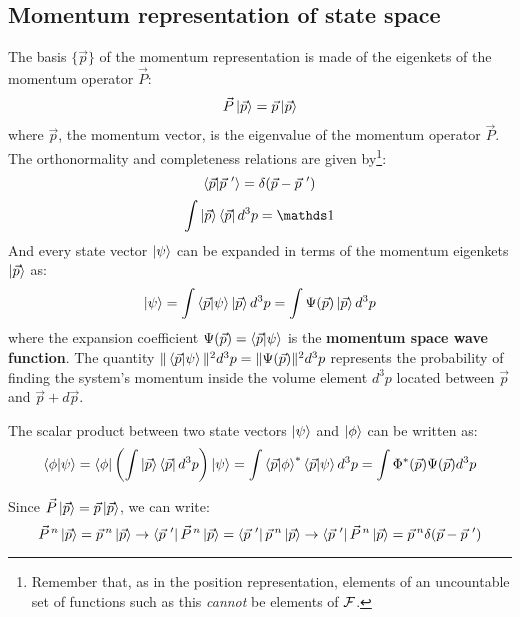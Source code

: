 \subsection{Momentum representation of state space}

The basis $\{\vec{p}\}$ of the momentum representation is made of the eigenkets of the momentum operator $\vec{P}$:
\begin{equation}
    \vec{P}\ket{\vec{p}} = \vec{p}\ket{\vec{p}}
\end{equation}
where $\vec{p}$, the momentum vector, is the eigenvalue of the momentum operator $\vec{P}$. The orthonormality and completeness relations are given by\footnote{Remember that, as in the position representation, elements of an uncountable set of functions such as this \textit{cannot} be elements of $\mathcal{F}$.}:
\begin{equation}
    \braket{\vec{p}|\vec{p}\ '} = \delta(\vec{p} - \vec{p}\ ')
\end{equation}
\begin{equation}
    \int \ket{\vec{p}}\bra{\vec{p}} d^3p = \Imat
\end{equation}
And every state vector $\ket{\psi}$ can be expanded in terms of the momentum eigenkets $\ket{\vec{p}}$ as:
\begin{equation}
    \ket{\psi} = \int \braket{\vec{p}|\psi} \ket{\vec{p}} d^3 p = \int \Psi(\vec{p}) \ket{\vec{p}} d^3 p
\end{equation}
where the expansion coefficient $\Psi(\vec{p}) = \braket{\vec{p}|\psi}$ is the \textbf{momentum space wave function}. The quantity $\|\braket{\vec{p}|\psi}\|^2d^3 p = \|\Psi(\vec{p})\|^2d^3p$ represents the probability of finding the system's momentum inside the volume element $d^3p$ located between $\vec{p}$ and $\vec{p} + d\vec{p}$.

The scalar product between two state vectors $\ket{\psi}$ and $\ket{\phi}$ can be written as:
\begin{equation}
    \braket{\phi|\psi} = \bra{\phi}\left(\int \ket{\vec{p}}\bra{\vec{p}}d^3p\right)\ket{\psi} = \int \braket{\vec{p}|\phi}^*\braket{\vec{p}|\psi} d^3p = \int \Phi^*(\vec{p})\Psi(\vec{p}) d^3p
\end{equation}

Since $\vec{P}\ket{\vec{p}} = \vec{p}\ket{\vec{p}}$, we can write:
\begin{equation}
    \vec{P}^{\, n}\ket{\vec{p}} = \vec{p}\, ^n\ket{\vec{p}} \to \bra{\vec{p}\ '}\vec{P}^{\, n}\ket{\vec{p}} = \bra{\vec{p}\ '}\vec{p}\, ^n\ket{\vec{p}} \to \bra{\vec{p}\ '}\vec{P}^{\, n}\ket{\vec{p}} = \vec{p}\, ^n\delta(\vec{p} - \vec{p}\ ')
\end{equation}


